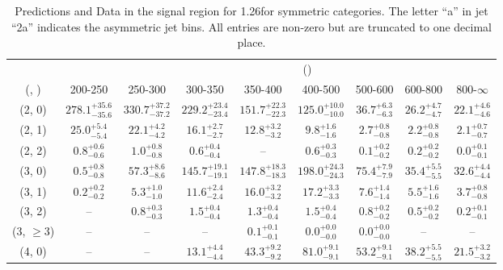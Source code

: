 \begin{table}[h!]
\tiny
\centering
\caption{Predictions and Data in the signal region for 1.26\ifb for symmetric categories. The letter ``a'' in jet \eg ``2a''  indicates the asymmetric jet bins. All entries are non-zero but are truncated to one decimal place.\label{tab:yieldsseppost_sig_zinv_sym}}
\begin{tabular}
{ccccccccc}
	\hline\hline
&	& \multicolumn{8}{c}{\scalht (\gev)} \\ 
	 (\njet,  \nb) & 200-250 & 250-300 & 300-350 & 350-400 & 400-500 & 500-600 & 600-800 & 800-$\infty$ \\ [0.8ex] 
\hline
	(2, 0) & $278.1^{+ 35.6 }_{- 35.6 }$ & $330.7^{+ 37.2 }_{- 37.2 }$ & $229.2^{+ 23.4 }_{- 23.4 }$ & $151.7^{+ 22.3 }_{- 22.3 }$ & $125.0^{+ 10.0 }_{- 10.0 }$ & $36.7^{+ 6.3 }_{- 6.3 }$ & $26.2^{+ 4.7 }_{- 4.7 }$ & $22.1^{+ 4.6 }_{- 4.6 }$ \\[0.5ex] 
	(2, 1) & $25.0^{+ 5.4 }_{- 5.4 }$ & $22.1^{+ 4.2 }_{- 4.2 }$ & $16.1^{+ 2.7 }_{- 2.7 }$ & $12.8^{+ 3.2 }_{- 3.2 }$ & $9.8^{+ 1.6 }_{- 1.6 }$ & $2.7^{+ 0.8 }_{- 0.8 }$ & $2.2^{+ 0.8 }_{- 0.8 }$ & $2.1^{+ 0.7 }_{- 0.7 }$ \\[0.5ex] 
	(2, 2) & $0.8^{+ 0.6 }_{- 0.6 }$ & $1.0^{+ 0.8 }_{- 0.8 }$ & $0.6^{+ 0.4 }_{- 0.4 }$ & -- & $0.6^{+ 0.3 }_{- 0.3 }$ & $0.1^{+ 0.2 }_{- 0.2 }$ & $0.2^{+ 0.2 }_{- 0.2 }$ & $0.0^{+ 0.1 }_{- 0.1 }$ \\[0.5ex] 
	(3, 0) & $0.5^{+ 0.8 }_{- 0.8 }$ & $57.3^{+ 8.6 }_{- 8.6 }$ & $145.7^{+ 19.1 }_{- 19.1 }$ & $147.8^{+ 18.3 }_{- 18.3 }$ & $198.0^{+ 24.3 }_{- 24.3 }$ & $75.4^{+ 7.9 }_{- 7.9 }$ & $35.4^{+ 5.5 }_{- 5.5 }$ & $32.6^{+ 4.4 }_{- 4.4 }$ \\[0.5ex] 
	(3, 1) & $0.2^{+ 0.2 }_{- 0.2 }$ & $5.3^{+ 1.0 }_{- 1.0 }$ & $11.6^{+ 2.4 }_{- 2.4 }$ & $16.0^{+ 3.2 }_{- 3.2 }$ & $17.2^{+ 3.3 }_{- 3.3 }$ & $7.6^{+ 1.4 }_{- 1.4 }$ & $5.5^{+ 1.6 }_{- 1.6 }$ & $3.7^{+ 0.8 }_{- 0.8 }$ \\[0.5ex] 
	(3, 2) & -- & $0.8^{+ 0.3 }_{- 0.3 }$ & $1.5^{+ 0.4 }_{- 0.4 }$ & $1.3^{+ 0.4 }_{- 0.4 }$ & $1.5^{+ 0.4 }_{- 0.4 }$ & $0.8^{+ 0.2 }_{- 0.2 }$ & $0.5^{+ 0.2 }_{- 0.2 }$ & $0.2^{+ 0.1 }_{- 0.1 }$ \\[0.5ex] 
	(3, $\ge3$) & -- & -- & -- & $0.1^{+ 0.1 }_{- 0.1 }$ & $0.0^{+ 0.0 }_{- 0.0 }$ & $0.0^{+ 0.0 }_{- 0.0 }$ & -- & -- \\[0.5ex] 
	(4, 0) & -- & -- & $13.1^{+ 4.4 }_{- 4.4 }$ & $43.3^{+ 9.2 }_{- 9.2 }$ & $81.0^{+ 9.1 }_{- 9.1 }$ & $53.2^{+ 9.1 }_{- 9.1 }$ & $38.2^{+ 5.5 }_{- 5.5 }$ & $21.5^{+ 3.2 }_{- 3.2 }$ \\[0.5ex] 

\end{tabular}
\end{table}
